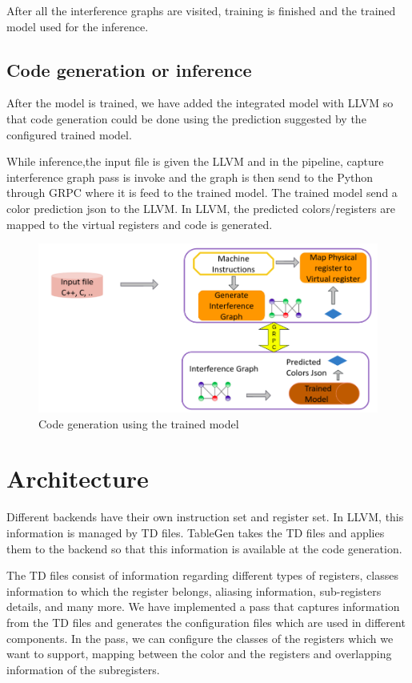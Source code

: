 After all the interference graphs are visited, training is finished and the trained model used for the inference.
\subsection{Code generation or inference}
After the model is trained, we have added the integrated model with LLVM so that code generation could be done using the prediction suggested by the configured trained model.

While inference,the input file is given the LLVM and in the pipeline,  capture interference graph pass is invoke and the graph is then send to the Python through GRPC where it is feed to the trained model. The trained model send a color prediction json to the LLVM. In LLVM, the predicted colors/registers are mapped to the virtual registers and code is generated. 
\begin{figure}[t]
    \centering
    \includegraphics[scale=0.4]{figures/chapter-5/mlra_inference.png}
    \caption{Code generation using the trained model}
     \label{fig:mlra-inference}
\end{figure}
\section{Architecture}
Different backends have their own instruction set and register set. In LLVM, this information is managed by TD files. TableGen takes the TD files and applies them to the backend so that this information is available at the code generation.

The TD files consist of information regarding different types of registers, classes information to which the register belongs, aliasing information, sub-registers details, and many more.
We have implemented a pass that captures information from the TD files and generates the configuration files which are used in different components. In the pass, we can configure the classes of the registers which we want to support, mapping between the color and the registers and overlapping information of the subregisters. 

